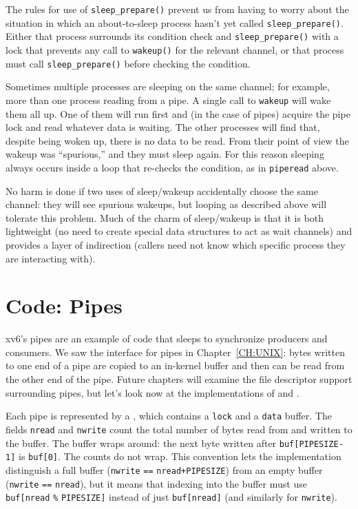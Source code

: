 The rules for use of \lstinline{sleep_prepare()} prevent us from
having to worry about the situation in which an about-to-sleep process
hasn't yet called \lstinline{sleep_prepare()}. Either that process
surrounds its condition check and \lstinline{sleep_prepare()} with a
lock that prevents any call to \lstinline{wakeup()} for the relevant
channel, or that process must call \lstinline{sleep_prepare()} before
checking the condition.

Sometimes multiple processes are sleeping
on the same channel; for example, more than one process
reading from a pipe.
A single call to 
\lstinline{wakeup}
will wake them all up.
One of them will run first and (in the case of pipes)
acquire the pipe lock and read whatever data is waiting.
The other processes will find that, despite being woken up,
there is no data to be read.
From their point of view the wakeup was ``spurious,'' and
they must sleep again.
For this reason sleeping always occurs inside a loop that
re-checks the condition, as in \lstinline{piperead} above.

No harm is done if two uses of sleep/wakeup accidentally
choose the same channel: they will see spurious wakeups,
but looping as described above will tolerate this problem.
Much of the charm of sleep/wakeup is that it is both
lightweight (no need to create special data
structures to act as wait channels) and provides a layer
of indirection (callers need not know which specific process
they are interacting with).
\section{Code: Pipes}
xv6's pipes are an example of code that sleeps
to synchronize producers and
consumers.
We saw the interface for pipes in Chapter~\ref{CH:UNIX}:
bytes written to one end of a pipe are copied
to an in-kernel buffer and then can be read from
the other end of the pipe.
Future chapters will examine the file descriptor support
surrounding pipes, but let's look now at the
implementations of 
and
.

Each pipe
is represented by a 
,
which contains
a 
\lstinline{lock}
and a 
\lstinline{data}
buffer.
The fields
\lstinline{nread}
and
\lstinline{nwrite}
count the total number of bytes read from
and written to the buffer.
The buffer wraps around:
the next byte written after
\lstinline{buf[PIPESIZE-1]}
is 
\lstinline{buf[0]}.
The counts do not wrap.
This convention lets the implementation
distinguish a full buffer 
(\lstinline{nwrite}
\lstinline{==}
\lstinline{nread+PIPESIZE})
from an empty buffer
(\lstinline{nwrite}
\lstinline{==}
\lstinline{nread}),
but it means that indexing into the buffer
must use
\lstinline{buf[nread}
\lstinline{%}
\lstinline{PIPESIZE]}
instead of just
\lstinline{buf[nread]} 
(and similarly for
\lstinline{nwrite}).

